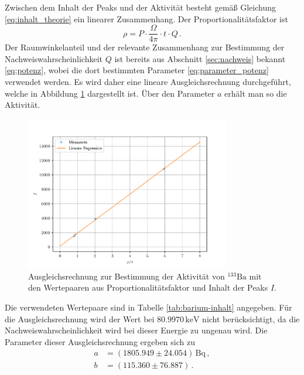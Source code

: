 \noindent
Zwischen dem Inhalt der Peaks und der Aktivität besteht gemäß Gleichung \ref{eq:inhalt_theorie}
ein linearer Zusammenhang. Der Proportionalitätsfaktor ist
\begin{equation}
    \rho = P \cdot \frac{\Omega}{4 \pi} \cdot t \cdot Q \, .
\end{equation}
Der Raumwinkelanteil und der relevante Zusammenhang zur Bestimmung der Nachweiswahrscheinlichkeit $Q$ ist bereits aus Abschnitt \ref{sec:nachweis} bekannt \eqref{eq:potenz}, 
wobei die dort bestimmten Parameter \eqref{eq:parameter_potenz} verwendet werden. 
Es wird daher eine lineare Ausgleichsrechnung durchgeführt, welche in Abbildung \ref{fig:ausgleichsrechnung-barium} dargestellt ist.
Über den Parameter $a$ erhält man so die Aktivität.
\begin{figure}
    \centering
    \includegraphics[width = 0.8\textwidth]{LineareRegression_Barium.pdf}
    \caption{Ausgleichsrechnung zur Bestimmung der Aktivität von $^{133}\text{Ba}$ mit den Wertepaaren aus Proportionalitätsfaktor und Inhalt der Peaks $I$.}
    \label{fig:ausgleichsrechnung-barium}
\end{figure}
Die verwendeten Wertepaare sind in Tabelle \ref{tab:barium-inhalt} angegeben. Für die Ausgleichsrechnung
wird der Wert bei $80.9970 \, \text{keV}$ nicht berücksichtigt, da die Nachweiswahrscheinlichkeit wird bei dieser Energie zu ungenau wird.
Die Parameter dieser Ausgleichsrechnung ergeben sich zu
\begin{align}
    a &= (1805.949 \pm 24.054) \, \text{Bq} \, , \\
    b &= (115.360 \pm 76.887) \, .
\end{align}
\FloatBarrier
